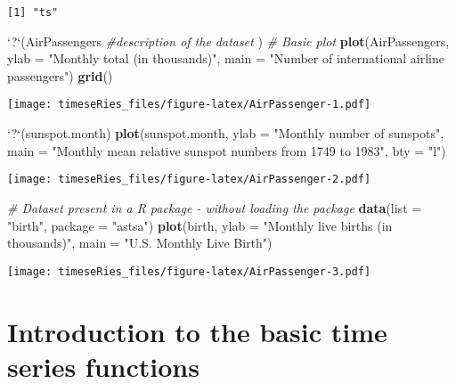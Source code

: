 \documentclass[]{book}
\newenvironment{Shaded}{\begin{snugshade}}{\end{snugshade}}
\newcommand{\CommentTok}[1]{\textcolor[rgb]{0.56,0.35,0.01}{\textit{#1}}}
\newcommand{\DataTypeTok}[1]{\textcolor[rgb]{0.13,0.29,0.53}{#1}}
\newcommand{\KeywordTok}[1]{\textcolor[rgb]{0.13,0.29,0.53}{\textbf{#1}}}
\newcommand{\NormalTok}[1]{#1}
\newcommand{\StringTok}[1]{\textcolor[rgb]{0.31,0.60,0.02}{#1}}
\begin{document}
\begin{verbatim}
[1] "ts"
\end{verbatim}

\begin{Shaded}
\begin{Highlighting}[]
\StringTok{`}\DataTypeTok{?}\StringTok{`}\NormalTok{(AirPassengers  }\CommentTok{#description of the dataset}
\NormalTok{)}
\CommentTok{# Basic plot}
\KeywordTok{plot}\NormalTok{(AirPassengers, }\DataTypeTok{ylab =} \StringTok{"Monthly total (in thousands)"}\NormalTok{, }\DataTypeTok{main =} \StringTok{"Number of international airline passengers"}\NormalTok{)}
\KeywordTok{grid}\NormalTok{()}
\end{Highlighting}
\end{Shaded}

\texttt{[image: timeseRies\_files/figure-latex/AirPassenger-1.pdf]}

\begin{Shaded}
\begin{Highlighting}[]
\StringTok{`}\DataTypeTok{?}\StringTok{`}\NormalTok{(sunspot.month)}
\KeywordTok{plot}\NormalTok{(sunspot.month, }\DataTypeTok{ylab =} \StringTok{"Monthly number of sunspots"}\NormalTok{, }\DataTypeTok{main =} \StringTok{"Monthly mean relative sunspot numbers from 1749 to 1983"}\NormalTok{, }
    \DataTypeTok{bty =} \StringTok{"l"}\NormalTok{)}
\end{Highlighting}
\end{Shaded}

\texttt{[image: timeseRies\_files/figure-latex/AirPassenger-2.pdf]}

\begin{Shaded}
\begin{Highlighting}[]
\CommentTok{# Dataset present in a R package - without loading the package}
\KeywordTok{data}\NormalTok{(}\DataTypeTok{list =} \StringTok{"birth"}\NormalTok{, }\DataTypeTok{package =} \StringTok{"astsa"}\NormalTok{)}
\KeywordTok{plot}\NormalTok{(birth, }\DataTypeTok{ylab =} \StringTok{"Monthly live births (in thousands)"}\NormalTok{, }\DataTypeTok{main =} \StringTok{"U.S. Monthly Live Birth"}\NormalTok{)}
\end{Highlighting}
\end{Shaded}

\texttt{[image: timeseRies\_files/figure-latex/AirPassenger-3.pdf]}

\hypertarget{introduction-to-the-basic-time-series-functions}{%
\section{Introduction to the basic time series
functions}\label{introduction-to-the-basic-time-series-functions}}
\end{document}
